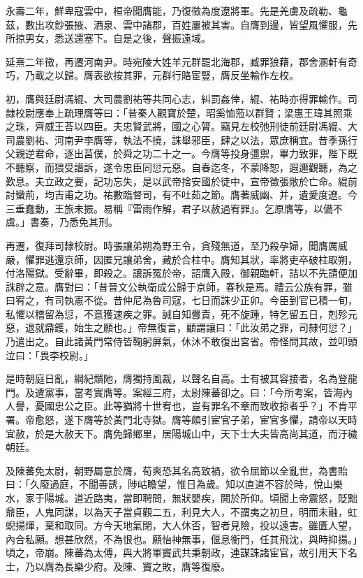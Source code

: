 \begin{pinyinscope}
永壽二年，鮮卑寇雲中，桓帝聞膺能，乃復徵為度遼將軍。先是羌虜及疏勒、龜茲，數出攻鈔張掖、酒泉、雲中諸郡，百姓屢被其害。自膺到邊，皆望風懼服，先所掠男女，悉送還塞下。自是之後，聲振遠域。

延熹二年徵，再遷河南尹。時宛陵大姓羊元群罷北海郡，臧罪狼藉，郡舍溷軒有奇巧，乃載之以歸。膺表欲按其罪，元群行賂宦豎，膺反坐輸作左校。

初，膺與廷尉馮緄、大司農劉祐等共同心志，糾罰姦倖，緄、祐時亦得罪輸作。司隸校尉應奉上疏理膺等曰：「昔秦人觀寶於楚，昭奚恤蒞以群賢；梁惠王瑋其照乘之珠，齊威王荅以四臣。夫忠賢武將，國之心膂。竊見左校弛刑徒前廷尉馮緄、大司農劉祐、河南尹李膺等，執法不撓，誅舉邪臣，肆之以法，眾庶稱宜。昔季孫行父親逆君命，逐出莒僕，於舜之功二十之一。今膺等投身彊禦，畢力致罪，陛下既不聽察，而猥受譖訴，遂令忠臣同愆元惡。自春迄冬，不蒙降恕，遐邇觀聽，為之歎息。夫立政之要，記功忘失，是以武帝捨安國於徒中，宣帝徵張敞於亡命。緄前討蠻荊，均吉甫之功。祐數臨督司，有不吐茹之節。膺著威幽、并，遺愛度遼。今三垂蠢動，王旅未振。易稱『雷雨作解，君子以赦過宥罪』。乞原膺等，以備不虞。」書奏，乃悉免其刑。

再遷，復拜司隸校尉。時張讓弟朔為野王令，貪殘無道，至乃殺孕婦，聞膺厲威嚴，懼罪逃還京師，因匿兄讓弟舍，藏於合柱中。膺知其狀，率將吏卒破柱取朔，付洛陽獄。受辭畢，即殺之。讓訴冤於帝，詔膺入殿，御親臨軒，詰以不先請便加誅辟之意。膺對曰：「昔晉文公執衛成公歸于京師，春秋是焉。禮云公族有罪，雖曰宥之，有司執憲不從。昔仲尼為魯司寇，七日而誅少正卯。今臣到官已積一旬，私懼以稽留為愆，不意獲速疾之罪。誠自知釁責，死不旋踵，特乞留五日，剋殄元惡，退就鼎鑊，始生之願也。」帝無復言，顧謂讓曰：「此汝弟之罪，司隸何愆？」乃遣出之。自此諸黃門常侍皆鞠躬屏氣，休沐不敢復出宮省。帝怪問其故，並叩頭泣曰：「畏李校尉。」

是時朝庭日亂，綱紀穨阤，膺獨持風裁，以聲名自高。士有被其容接者，名為登龍門。及遭黨事，當考實膺等。案經三府，太尉陳蕃卻之。曰：「今所考案，皆海內人譽，憂國忠公之臣。此等猶將十世宥也，豈有罪名不章而致收掠者乎？」不肯平署。帝愈怒，遂下膺等於黃門北寺獄。膺等頗引宦官子弟，宦官多懼，請帝以天時宜赦，於是大赦天下。膺免歸鄉里，居陽城山中，天下士大夫皆高尚其道，而汙穢朝廷。

及陳蕃免太尉，朝野屬意於膺，荀爽恐其名高致禍，欲令屈節以全亂世，為書貽曰：「久廢過庭，不聞善誘，陟岵瞻望，惟日為歲。知以直道不容於時，悅山樂水，家于陽城。道近路夷，當即聘問，無狀嬰疾，闕於所仰。頃聞上帝震怒，貶黜鼎臣，人鬼同謀，以為天子當貞觀二五，利見大人，不謂夷之初旦，明而未融，虹蜺揚煇，棄和取同。方今天地氣閉，大人休否，智者見險，投以遠害。雖匱人望，內合私願。想甚欣然，不為恨也。願怡神無事，偃息衡門，任其飛沈，與時抑揚。」頃之，帝崩。陳蕃為太傅，與大將軍竇武共秉朝政，連謀誅諸宦官，故引用天下名士，乃以膺為長樂少府。及陳、竇之敗，膺等復廢。


\end{pinyinscope}
